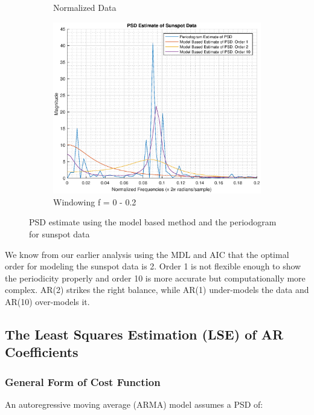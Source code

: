 \documentclass{article}
\begin{document}
\begin{figure}[h!]
\begin{subfigure}{0.32\textwidth}
\caption{Normalized Data}
\label{fig:ar_model_sunspot}
\end{subfigure}
\begin{subfigure}{0.32\textwidth}
\centering
\includegraphics[width = \textwidth]{ar_model_sunspot_zoom}
\caption{Windowing f = 0 - 0.2}
\label{fig:ar_model_sunspot_zoom}
\end{subfigure}
\caption{PSD estimate using the model based method and the periodogram for sunspot data}
\label{fig:ar_spec_sunspot}
\end{figure}

We know from our earlier analysis using the MDL and AIC that the optimal order for modeling the sunspot data is 2. Order 1 is not flexible enough to show the periodicity properly and order 10 is more accurate but computationally more complex. AR(2) strikes the right balance, while AR(1) under-models the data and AR(10) over-models it.


\subsection{The Least Squares Estimation (LSE) of AR Coefficients}

\subsubsection{General Form of Cost Function}

An autoregressive moving average (ARMA) model assumes a PSD of:
\end{document}
